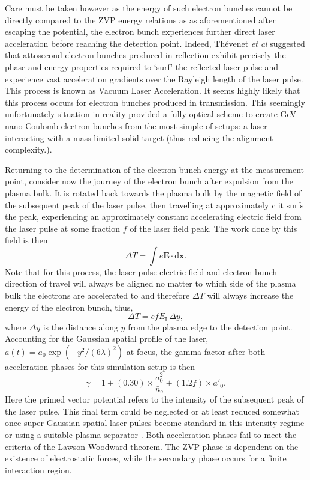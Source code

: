 Care must be taken however as the energy of such electron bunches cannot be directly compared to the ZVP energy relations as as aforementioned after escaping the potential, the electron bunch experiences further direct laser acceleration before reaching the detection point. Indeed, Thévenet \textit{et al} \cite{thevenetVacuumLaserAcceleration2016} suggested that attosecond electron bunches produced in reflection exhibit precisely the phase and energy properties required to `surf' the reflected laser pulse and experience vast acceleration gradients over the Rayleigh length of the laser pulse. This process is known as Vacuum Laser Acceleration. It seems highly likely that this process occurs for electron bunches produced in transmission. This seemingly unfortunately situation in reality provided a fully optical scheme to create GeV nano-Coulomb electron bunches from the most simple of setups: a laser interacting with a mass limited solid target (thus reducing the alignment complexity.). 

Returning to the determination of the electron bunch energy at the measurement point, consider now the journey of the electron bunch after expulsion from the plasma bulk. It is rotated back towards the plasma bulk by the magnetic field of the subsequent peak of the laser pulse, then travelling at approximately $c$ it surfs the peak, experiencing an approximately constant accelerating electric field from the laser pulse at some fraction $f$ of the laser field peak. The work done by this field is then
\begin{equation}
	\Delta T = \int e \mathbf{E} \cdot \mathrm{d}\mathbf{x}.
\end{equation}
Note that for this process, the laser pulse electric field and electron bunch direction of travel will always be aligned no matter to which side of the plasma bulk the electrons are accelerated to and therefore $\Delta T$ will always increase the energy of the electron bunch, thus,
\begin{equation}
	\Delta T = e f E_\mathrm{L} \Delta y,
\end{equation}
where $\Delta y$ is the distance along $y$ from the plasma edge to the detection point. Accounting for the Gaussian spatial profile of the laser, $a(t) = a_0 \exp(-y^2/(6\lambda)^2)$ at focus, the gamma factor after both acceleration phases for this simulation setup is then
\begin{equation}\label{eq:zvp-gamma}
	\gamma = 1 + (0.30)\times \frac{a^2_0}{\bar{n}_\mathrm{e}} + (1.2f)\times a'_0.
\end{equation}
Here the primed vector potential refers to the intensity of the subsequent peak of the laser pulse. This final term could be neglected or at least reduced somewhat once super-Gaussian spatial laser pulses become standard in this intensity regime or using a suitable plasma separator \cite{miyauchi_2004_LaserElectronAcceleration}. Both acceleration phases fail to meet the criteria of the Lawson-Woodward theorem. The ZVP phase is dependent on the existence of electrostatic forces, while the secondary phase occurs for a finite interaction region.

